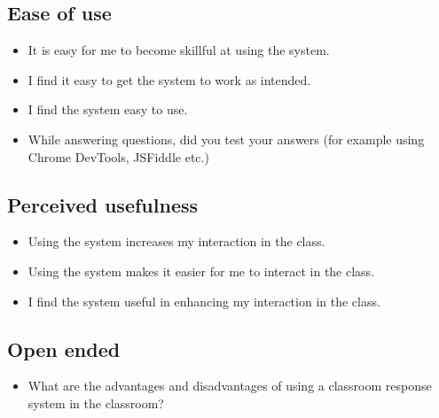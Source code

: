 \subsection{Ease of use}
\begin{itemize}
    \item It is easy for me to become skillful at using the system.
    \item I find it easy to get the system to work as intended.
    \item I find the system easy to use.
    \item While answering questions, did you test your answers (for example using Chrome DevTools, JSFiddle etc.)
\end{itemize}

\subsection{Perceived usefulness}
\begin{itemize}
    \item Using the system increases my interaction in the class.
    \item Using the system makes it easier for me to interact in the class.
    \item I find the system useful in enhancing my interaction in the class.
\end{itemize}

\subsection{Open ended}
\begin{itemize}
    \item What are the advantages and disadvantages of using a classroom response system in the classroom?
\end{itemize}